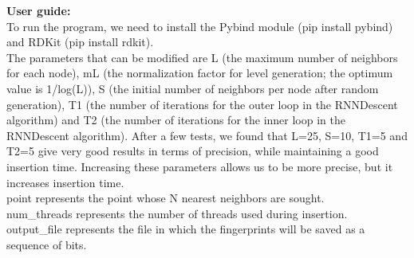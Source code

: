 \documentclass{article}
\begin{document}
\newpage

\textbf{User guide:}\\

To run the program, we need to install the Pybind module (pip install pybind) and RDKit (pip install rdkit).\\

The parameters that can be modified are L (the maximum number of neighbors for each node), mL (the normalization factor for level generation; the optimum value is 1/log(L)), S (the initial number of neighbors per node after random generation), T1 (the number of iterations for the outer loop in the RNNDescent algorithm) and T2 (the number of iterations for the inner loop in the RNNDescent algorithm). After a few tests, we found that L=25, S=10, T1=5 and T2=5 give very good results in terms of precision, while maintaining a good insertion time. Increasing these parameters allows us to be more precise, but it increases insertion time.\\

point represents the point whose N nearest neighbors are sought. \\

num\_threads represents the number of threads used during insertion. \\

output\_file represents the file in which the fingerprints will be saved as a sequence of bits.
\end{document}
